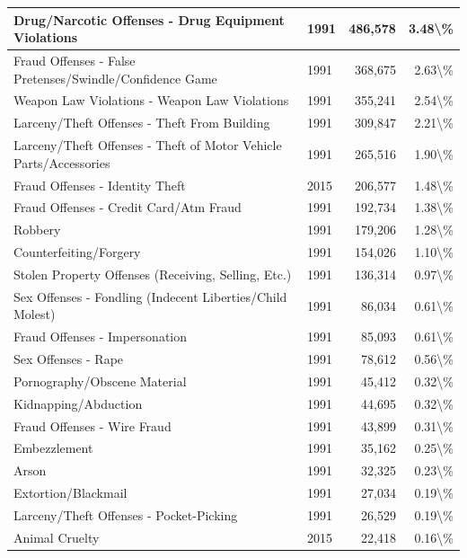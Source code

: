 \documentclass[
]{krantz}
\begin{document}
\begin{longtable}[t]{l|l|r|r}
\hline
Drug/Narcotic Offenses - Drug Equipment Violations & 1991 & 486,578 & 3.48\textbackslash{}\%\\
\hline
Fraud Offenses - False Pretenses/Swindle/Confidence Game & 1991 & 368,675 & 2.63\textbackslash{}\%\\
\hline
Weapon Law Violations - Weapon Law Violations & 1991 & 355,241 & 2.54\textbackslash{}\%\\
\hline
Larceny/Theft Offenses - Theft From Building & 1991 & 309,847 & 2.21\textbackslash{}\%\\
\hline
Larceny/Theft Offenses - Theft of Motor Vehicle Parts/Accessories & 1991 & 265,516 & 1.90\textbackslash{}\%\\
\hline
Fraud Offenses - Identity Theft & 2015 & 206,577 & 1.48\textbackslash{}\%\\
\hline
Fraud Offenses - Credit Card/Atm Fraud & 1991 & 192,734 & 1.38\textbackslash{}\%\\
\hline
Robbery & 1991 & 179,206 & 1.28\textbackslash{}\%\\
\hline
Counterfeiting/Forgery & 1991 & 154,026 & 1.10\textbackslash{}\%\\
\hline
Stolen Property Offenses (Receiving, Selling, Etc.) & 1991 & 136,314 & 0.97\textbackslash{}\%\\
\hline
Sex Offenses - Fondling (Indecent Liberties/Child Molest) & 1991 & 86,034 & 0.61\textbackslash{}\%\\
\hline
Fraud Offenses - Impersonation & 1991 & 85,093 & 0.61\textbackslash{}\%\\
\hline
Sex Offenses - Rape & 1991 & 78,612 & 0.56\textbackslash{}\%\\
\hline
Pornography/Obscene Material & 1991 & 45,412 & 0.32\textbackslash{}\%\\
\hline
Kidnapping/Abduction & 1991 & 44,695 & 0.32\textbackslash{}\%\\
\hline
Fraud Offenses - Wire Fraud & 1991 & 43,899 & 0.31\textbackslash{}\%\\
\hline
Embezzlement & 1991 & 35,162 & 0.25\textbackslash{}\%\\
\hline
Arson & 1991 & 32,325 & 0.23\textbackslash{}\%\\
\hline
Extortion/Blackmail & 1991 & 27,034 & 0.19\textbackslash{}\%\\
\hline
Larceny/Theft Offenses - Pocket-Picking & 1991 & 26,529 & 0.19\textbackslash{}\%\\
\hline
Animal Cruelty & 2015 & 22,418 & 0.16\textbackslash{}\%\\

\end{longtable}
\end{document}
